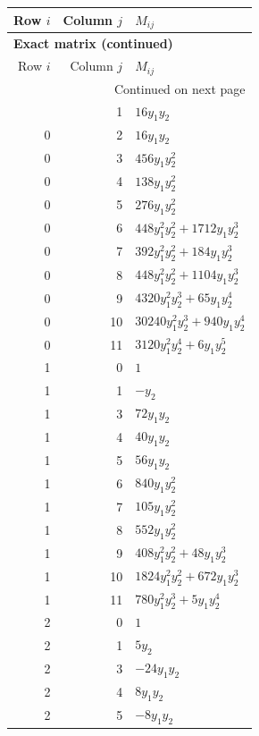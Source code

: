 \documentclass[10pt,a4paper]{article}
\begin{document}
{\small\setlength{\tabcolsep}{7pt}\begin{longtable}{rrp{125mm}}
\toprule Row $i$ & Column $j$ & $M_{ij}$\\\midrule\endfirsthead
\multicolumn{3}{l}{\textbf{Exact matrix (continued)}}\\
\toprule Row $i$ & Column $j$ & $M_{ij}$\\\midrule\endhead
\midrule\multicolumn{3}{r}{Continued on next page}\\\endfoot\bottomrule\endlastfoot
0 & 1 & $16 y_{1} y_{2}$\\
0 & 2 & $16 y_{1} y_{2}$\\
0 & 3 & $456 y_{1} y_{2}^{2}$\\
0 & 4 & $138 y_{1} y_{2}^{2}$\\
0 & 5 & $276 y_{1} y_{2}^{2}$\\
0 & 6 & $448 y_{1}^{2} y_{2}^{2} + 1712 y_{1} y_{2}^{3}$\\
0 & 7 & $392 y_{1}^{2} y_{2}^{2} + 184 y_{1} y_{2}^{3}$\\
0 & 8 & $448 y_{1}^{2} y_{2}^{2} + 1104 y_{1} y_{2}^{3}$\\
0 & 9 & $4320 y_{1}^{2} y_{2}^{3} + 65 y_{1} y_{2}^{4}$\\
0 & 10 & $30240 y_{1}^{2} y_{2}^{3} + 940 y_{1} y_{2}^{4}$\\
0 & 11 & $3120 y_{1}^{2} y_{2}^{4} + 6 y_{1} y_{2}^{5}$\\
1 & 0 & $1$\\
1 & 1 & $- y_{2}$\\
1 & 3 & $72 y_{1} y_{2}$\\
1 & 4 & $40 y_{1} y_{2}$\\
1 & 5 & $56 y_{1} y_{2}$\\
1 & 6 & $840 y_{1} y_{2}^{2}$\\
1 & 7 & $105 y_{1} y_{2}^{2}$\\
1 & 8 & $552 y_{1} y_{2}^{2}$\\
1 & 9 & $408 y_{1}^{2} y_{2}^{2} + 48 y_{1} y_{2}^{3}$\\
1 & 10 & $1824 y_{1}^{2} y_{2}^{2} + 672 y_{1} y_{2}^{3}$\\
1 & 11 & $780 y_{1}^{2} y_{2}^{3} + 5 y_{1} y_{2}^{4}$\\
2 & 0 & $1$\\
2 & 1 & $5 y_{2}$\\
2 & 3 & $- 24 y_{1} y_{2}$\\
2 & 4 & $8 y_{1} y_{2}$\\
2 & 5 & $- 8 y_{1} y_{2}$\\

\end{longtable}}
\end{document}
